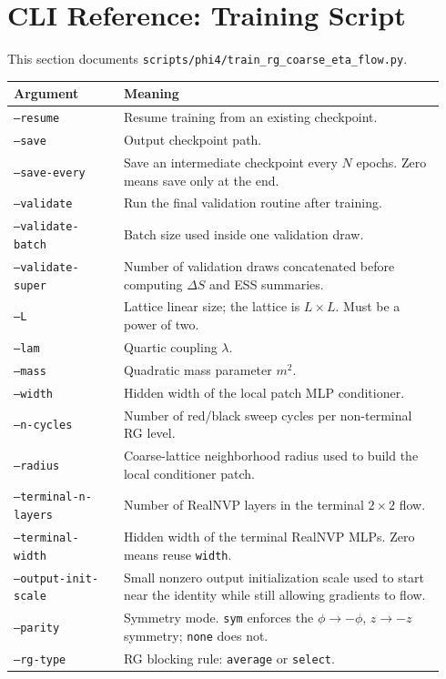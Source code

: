 \documentclass[11pt]{article}
\begin{document}
\section{CLI Reference: Training Script}

This section documents
\texttt{scripts/phi4/train\_rg\_coarse\_eta\_flow.py}.

\begin{longtable}{p{0.24\linewidth}p{0.70\linewidth}}
\toprule
Argument & Meaning \\
\midrule
\endhead
\texttt{--resume} & Resume training from an existing checkpoint. \\
\texttt{--save} & Output checkpoint path. \\
\texttt{--save-every} & Save an intermediate checkpoint every $N$ epochs. Zero means save only at the end. \\
\texttt{--validate} & Run the final validation routine after training. \\
\texttt{--validate-batch} & Batch size used inside one validation draw. \\
\texttt{--validate-super} & Number of validation draws concatenated before computing $\Delta S$ and ESS summaries. \\
\texttt{--L} & Lattice linear size; the lattice is $L\times L$. Must be a power of two. \\
\texttt{--lam} & Quartic coupling $\lambda$. \\
\texttt{--mass} & Quadratic mass parameter $m^2$. \\
\texttt{--width} & Hidden width of the local patch MLP conditioner. \\
\texttt{--n-cycles} & Number of red/black sweep cycles per non-terminal RG level. \\
\texttt{--radius} & Coarse-lattice neighborhood radius used to build the local conditioner patch. \\
\texttt{--terminal-n-layers} & Number of RealNVP layers in the terminal $2\times 2$ flow. \\
\texttt{--terminal-width} & Hidden width of the terminal RealNVP MLPs. Zero means reuse \texttt{width}. \\
\texttt{--output-init-scale} & Small nonzero output initialization scale used to start near the identity while still allowing gradients to flow. \\
\texttt{--parity} & Symmetry mode. \texttt{sym} enforces the $\phi\to-\phi$, $z\to-z$ symmetry; \texttt{none} does not. \\
\texttt{--rg-type} & RG blocking rule: \texttt{average} or \texttt{select}. \\

\end{longtable}
\end{document}
